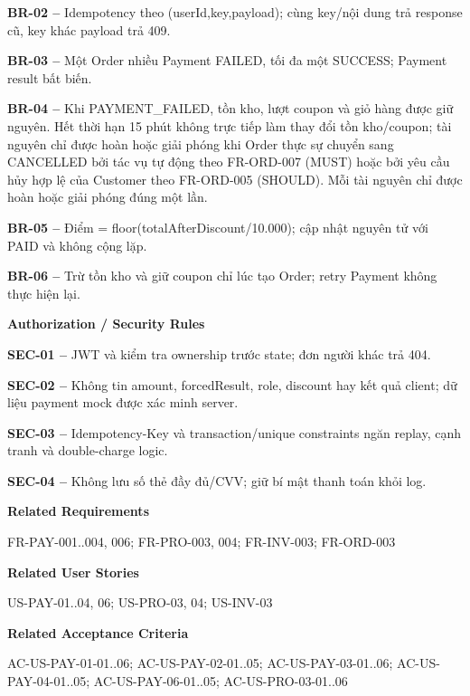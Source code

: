 \documentclass[11pt,a4paper,oneside]{report}
\begin{document}
\textbf{BR-02 --} Idempotency theo (userId,key,payload); cùng key/nội dung trả response cũ, key khác payload trả 409.

\textbf{BR-03 --} Một Order nhiều Payment FAILED, tối đa một SUCCESS; Payment result bất biến.

\textbf{BR-04 --} Khi PAYMENT\_FAILED, tồn kho, lượt coupon và giỏ hàng được giữ nguyên. Hết thời hạn 15 phút không trực tiếp làm thay đổi tồn kho/coupon; tài nguyên chỉ được hoàn hoặc giải phóng khi Order thực sự chuyển sang CANCELLED bởi tác vụ tự động theo FR-ORD-007 (MUST) hoặc bởi yêu cầu hủy hợp lệ của Customer theo FR-ORD-005 (SHOULD). Mỗi tài nguyên chỉ được hoàn hoặc giải phóng đúng một lần.

\textbf{BR-05 --} Điểm = floor(totalAfterDiscount/10.000); cập nhật nguyên tử với PAID và không cộng lặp.

\textbf{BR-06 --} Trừ tồn kho và giữ coupon chỉ lúc tạo Order; retry Payment không thực hiện lại.
\par

\par\smallskip\noindent\textcolor{sgublue}{\textbf{Authorization / Security Rules}}\par\nobreak
\textbf{SEC-01 --} JWT và kiểm tra ownership trước state; đơn người khác trả 404.

\textbf{SEC-02 --} Không tin amount, forcedResult, role, discount hay kết quả client; dữ liệu payment mock được xác minh server.

\textbf{SEC-03 --} Idempotency-Key và transaction/unique constraints ngăn replay, cạnh tranh và double-charge logic.

\textbf{SEC-04 --} Không lưu số thẻ đầy đủ/CVV; giữ bí mật thanh toán khỏi log.
\par

\par\smallskip\noindent\textcolor{sgublue}{\textbf{Related Requirements}}\par\nobreak
FR-PAY-001..004, 006; FR-PRO-003, 004; FR-INV-003; FR-ORD-003
\par

\par\smallskip\noindent\textcolor{sgublue}{\textbf{Related User Stories}}\par\nobreak
US-PAY-01..04, 06; US-PRO-03, 04; US-INV-03
\par

\par\smallskip\noindent\textcolor{sgublue}{\textbf{Related Acceptance Criteria}}\par\nobreak
AC-US-PAY-01-01..06; AC-US-PAY-02-01..05; AC-US-PAY-03-01..06; AC-US-PAY-04-01..05; AC-US-PAY-06-01..05; AC-US-PRO-03-01..06
\par
\end{document}
